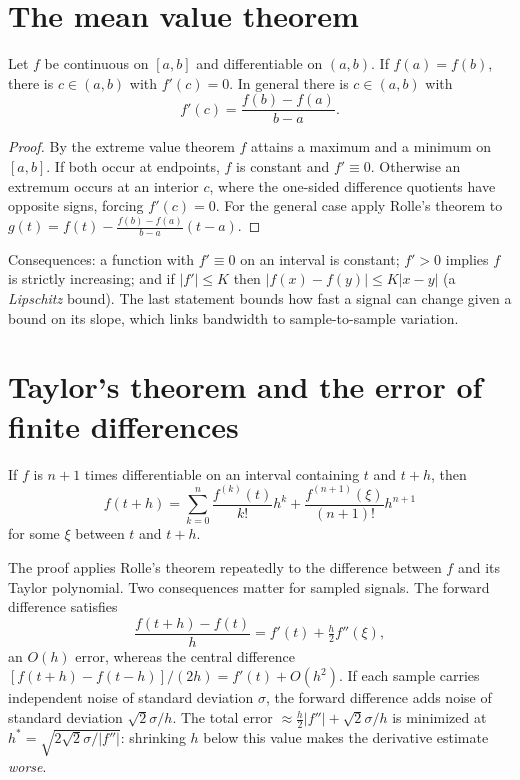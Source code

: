 \section{The mean value theorem}
\begin{theorem}
Let $f$ be continuous on $[a,b]$ and differentiable on $(a,b)$. If $f(a)=f(b)$, there is $c\in(a,b)$ with $f'(c)=0$. In general there is $c\in(a,b)$ with
\[
f'(c)=\frac{f(b)-f(a)}{b-a}.
\]
\end{theorem}
\begin{proof}
By the extreme value theorem $f$ attains a maximum and a minimum on $[a,b]$. If both occur at endpoints, $f$ is constant and $f'\equiv0$. Otherwise an extremum occurs at an interior $c$, where the one-sided difference quotients have opposite signs, forcing $f'(c)=0$. For the general case apply Rolle's theorem to $g(t)=f(t)-\frac{f(b)-f(a)}{b-a}(t-a)$.
\end{proof}
Consequences: a function with $f'\equiv0$ on an interval is constant; $f'>0$ implies $f$ is strictly increasing; and if $|f'|\le K$ then $|f(x)-f(y)|\le K|x-y|$ (a \emph{Lipschitz} bound). The last statement bounds how fast a signal can change given a bound on its slope, which links bandwidth to sample-to-sample variation.

\section{Taylor's theorem and the error of finite differences}
\begin{theorem}
If $f$ is $n+1$ times differentiable on an interval containing $t$ and $t+h$, then
\[
f(t+h)=\sum_{k=0}^n\frac{f^{(k)}(t)}{k!}h^k+\frac{f^{(n+1)}(\xi)}{(n+1)!}h^{n+1}
\]
for some $\xi$ between $t$ and $t+h$.
\end{theorem}
The proof applies Rolle's theorem repeatedly to the difference between $f$ and its Taylor polynomial. Two consequences matter for sampled signals. The forward difference satisfies
\[
\frac{f(t+h)-f(t)}h=f'(t)+\tfrac h2f''(\xi),
\]
an $O(h)$ error, whereas the central difference $[f(t+h)-f(t-h)]/(2h)=f'(t)+O(h^2)$. If each sample carries independent noise of standard deviation $\sigma$, the forward difference adds noise of standard deviation $\sqrt2\sigma/h$. The total error $\approx\frac h2|f''|+\sqrt2\sigma/h$ is minimized at $h^\ast=\sqrt{2\sqrt2\sigma/|f''|}$: shrinking $h$ below this value makes the derivative estimate \emph{worse}.

